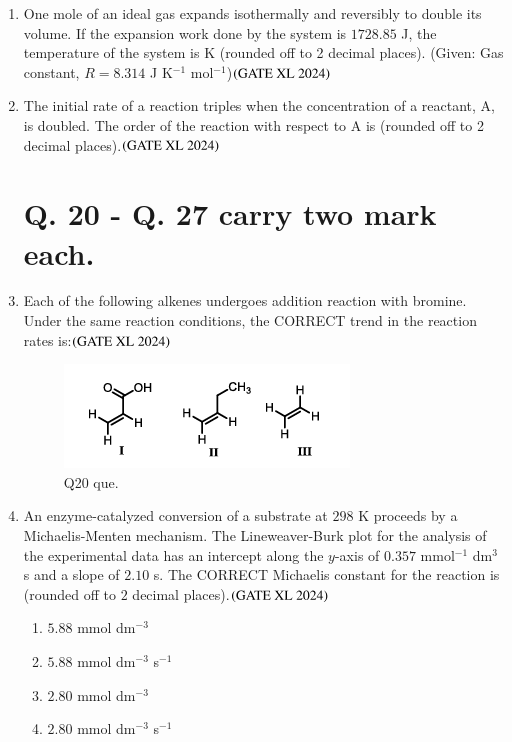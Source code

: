 \documentclass[journal]{IEEEtran}
\begin{document}
\begin{enumerate}
    \item One mole of an ideal gas expands isothermally and reversibly to double its volume. If the expansion work done by the system is $1728.85$ J, the temperature of the system is K (rounded off to 2 decimal places).  
    (Given: Gas constant, $R = 8.314$ J K$^{-1}$ mol$^{-1}$)\hfill $\left(\text{GATE XL 2024}\right)$

    \item The initial rate of a reaction triples when the concentration of a reactant, A, is doubled. The order of the reaction with respect to A is (rounded off to 2 decimal places).\hfill $\left(\text{GATE XL 2024}\right)$
\section*{Q. 20 - Q. 27 carry two mark each.} 
    \item Each of the following alkenes undergoes addition reaction with bromine. Under the same reaction conditions, the CORRECT trend in the reaction rates is:\hfill $\left(\text{GATE XL 2024}\right)$
    \begin{figure}[H]
        \centering
        \includegraphics[width=0.9\columnwidth]{figs/xl2024_q20_que.png}
        \caption{Q20 que.}
    \end{figure}
    \begin{enumerate}
    \end{enumerate}

    \item An enzyme-catalyzed conversion of a substrate at $298$ K proceeds by a Michaelis-Menten mechanism. The Lineweaver-Burk plot for the analysis of the experimental data has an intercept along the $y$-axis of $0.357$ mmol$^{-1}$ dm$^3$ s and a slope of $2.10$ s. The CORRECT Michaelis constant for the reaction is (rounded off to $2$ decimal places).\hfill $\left(\text{GATE XL 2024}\right)$
    \begin{enumerate}
            \item $5.88$ mmol dm$^{-3}$
            \item $5.88$ mmol dm$^{-3}$ s$^{-1}$
            \item $2.80$ mmol dm$^{-3}$
            \item $2.80$ mmol dm$^{-3}$ s$^{-1}$
    \end{enumerate}


\end{enumerate}
\end{document}
